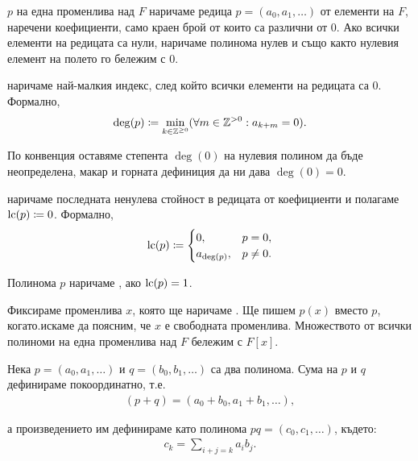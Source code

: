 \documentclass[numbers=endperiod, bibliography=totocnumbered]{scrartcl}
\begin{document}
\begin{definition}
   \( p \) на една променлива над \( F \) наричаме редица \( p = (a_0, a_1, \ldots) \) от елементи на \( F \), наречени коефициенти, само краен брой от които са различни от \( 0 \). Ако всички елементи на редицата са нули, наричаме полинома нулев и също както нулевия елемент на полето го бележим с \( 0 \).

   наричаме най-малкия индекс, след който всички елементи на редицата са \( 0 \). Формално,
  \begin{align*}
    \deg(p) \coloneqq \min_{k \in \mathbb{Z}^{\geq 0}} (\forall m \in \mathbb{Z}^{> 0} : a_{k + m} = 0).
  \end{align*}

  По конвенция оставяме степента \( \deg(0) \) на нулевия полином да бъде неопределена, макар и горната дефиниция да ни дава \( \deg(0) = 0 \).

   наричаме последната ненулева стойност в редицата от коефициенти и полагаме \( \operatorname{lc}(p) \coloneqq 0 \). Формално,
  \begin{align*}
    \operatorname{lc}(p) \coloneqq
    \begin{cases}
      0, &p = 0, \\
      a_{\deg(p)}, &p \neq 0.
    \end{cases}
  \end{align*}

  Полинома \( p \) наричаме , ако \( \operatorname{lc}(p) = 1 \).
\end{definition}

Фиксираме променлива \( x \), която ще наричаме .
Ще пишем \( p(x) \) вместо \( p \), когато.искаме да поясним, че \( x \) е свободната променлива. Множеството от всички полиноми на една променлива над \( F \) бележим с \( F[x] \).

Нека \( p = (a_0, a_1, \ldots) \) и \( q = (b_0, b_1, \ldots) \) са два полинома. Сума на \( p \) и \( q \) дефинираме покоординатно, т.е.
\begin{align*}
  (p + q) = (a_0 + b_0, a_1 + b_1, \ldots),
\end{align*}

а произведението им дефинираме като полинома \( pq = (c_0, c_1, \ldots) \), където:
\begin{align*}
  c_k = \sum_{i+j=k} a_i b_j.
\end{align*}
\end{document}
